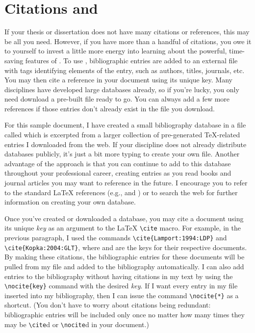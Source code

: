 \section{Citations and \BiBTeX}
If your thesis or dissertation does not have many citations or
references, this may be all you need. However, if you have more than a
handful of citations, you owe it to yourself to invest a little more
energy into learning about the powerful, time-saving features of
\BiBTeX.  To use \BiBTeX, bibliographic entries are added to an
external file with tags identifying elements of the entry, such as
authors, titles, journals, etc.  You may then cite a reference in
your document using its unique key.  Many disciplines have developed
large \BiBTeX{} databases already, so if you're lucky, you only need
download a pre-built file ready to go.  You can always add a few more
references if those entries don't already exist in the file you
download.

For this sample document, I have created a small \BiBTeX{}
bibliography database in a file called  which is
excerpted from a larger collection of pre-generated \TeX-related
entries I downloaded from the web.  If your discipline does not
already distribute \BiBTeX{} databases publicly, it's just a bit
more typing to create your own \BiBTeX{} file.  Another advantage of
the \BiBTeX{} approach is that you can continue to add to this
database throughout your professional career, creating entries as you
read books and journal articles you may want to reference in the
future.  I encourage you to refer to the standard \LaTeX{} references
(e.g., \cite{Lamport:1994:LDP} and \cite{Kopka:2004:GLT}) or to search
the web for further information on creating your own \BiBTeX{}
database.

Once you've created or downloaded a \BiBTeX{} database, you may cite a
document using its unique \textit{key} as an argument to
the \LaTeX{} \verb|\cite| macro.  For example, in the previous
paragraph, I used the commands \verb|\cite{Lamport:1994:LDP}| and
\verb|\cite{Kopka:2004:GLT}|, where  and
 are the keys for their respective documents.
By making these citations, the bibliographic entries for these
documents will be pulled from my \BiBTeX{} file and added to the
bibliography automatically.  I can also add entries to the
bibliography without having citations in my text by using
the \verb|\nocite{key}| command with the desired \textit{key}.
If I want every entry in my \BiBTeX{} file inserted into my
bibliography, then I can issue the command \verb|\nocite{*}|
as a shortcut.  (You don't have to worry about citations being
redundant: bibliographic entries will be included only once no matter
how many times they may be \verb|\cite|d or \verb|\nocite|d in your
document.)

